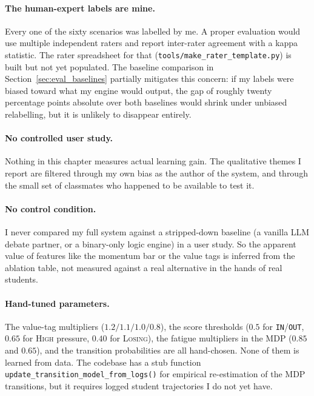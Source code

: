 \paragraph{The human-expert labels are mine.} Every one of the sixty scenarios was labelled by me. A proper evaluation would use multiple independent raters and report inter-rater agreement with a kappa statistic. The rater spreadsheet for that (\texttt{tools/make\_rater\_template.py}) is built but not yet populated. The baseline comparison in Section~\ref{sec:eval_baselines} partially mitigates this concern: if my labels were biased toward what my engine would output, the gap of roughly twenty percentage points absolute over both baselines would shrink under unbiased relabelling, but it is unlikely to disappear entirely.

\paragraph{No controlled user study.} Nothing in this chapter measures actual learning gain. The qualitative themes I report are filtered through my own bias as the author of the system, and through the small set of classmates who happened to be available to test it.

\paragraph{No control condition.} I never compared my full system against a stripped-down baseline (a vanilla LLM debate partner, or a binary-only logic engine) in a user study. So the apparent value of features like the momentum bar or the value tags is inferred from the ablation table, not measured against a real alternative in the hands of real students.

\paragraph{Hand-tuned parameters.} The value-tag multipliers ($1.2/1.1/1.0/0.8$), the score thresholds ($0.5$ for \texttt{IN}/\texttt{OUT}, $0.65$ for \textsc{High} pressure, $0.40$ for \textsc{Losing}), the fatigue multipliers in the MDP ($0.85$ and $0.65$), and the transition probabilities are all hand-chosen. None of them is learned from data. The codebase has a stub function \texttt{update\_transition\_model\_from\_logs()} for empirical re-estimation of the MDP transitions, but it requires logged student trajectories I do not yet have.


